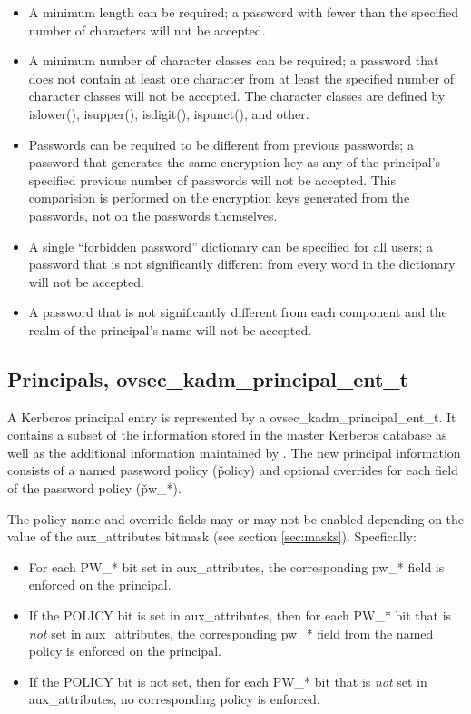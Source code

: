 \begin{itemize}
\item A minimum length can be required; a password with
fewer than the specified number of characters will not be accepted.

\item A minimum number of character classes can be required; a
password that does not contain at least one character from at least
the specified number of character classes will not be accepted.  The
character classes are defined by islower(), isupper(), isdigit(),
ispunct(), and other.

\item Passwords can be required to be different from
previous passwords; a password that generates the same encryption key
as any of the principal's specified previous number of passwords will
not be accepted.  This comparision is performed on the encryption keys
generated from the passwords, not on the passwords themselves.

\item A single ``forbidden password'' dictionary can be specified for all
users; a password that is not significantly different from every word
in the dictionary will not be accepted.

\item A password that is not significantly different from each
component and the realm of the principal's name will not be accepted.
\end{itemize}

\subsection{Principals, ovsec_kadm_principal_ent_t}
\label{sec:principal-structure}

A Kerberos principal entry is represented by a
ovsec_kadm_principal_ent_t.  It contains a subset of the information
stored in the master Kerberos database as well as the additional
information maintained by \secure{}.  The new principal information
consists of a named password policy (\v{policy}) and optional
overrides for each field of the password policy (\v{pw_*}).  

The policy name and override fields may or may not be enabled
depending on the value of the aux_attributes bitmask (see section
\ref{sec:masks}).  Specfically:

\begin{itemize}
\item For each PW_* bit set in aux_attributes, the corresponding pw_*
field is enforced on the principal.

\item If the POLICY bit is set in aux_attributes, then for each PW_*
bit that is {\it not} set in aux_attributes, the corresponding pw_*
field from the named policy is enforced on the principal.

\item If the POLICY bit is not set, then for each PW_* bit that is
{\it not} set in aux_attributes, no corresponding policy is enforced.
\end{itemize}

